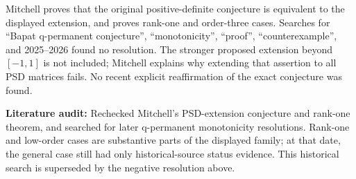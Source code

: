 \documentclass[11pt,a4paper]{article}
\begin{document}
Mitchell proves that the original positive-definite conjecture is
equivalent to the displayed extension, and proves rank-one and
order-three cases. Searches for ``Bapat q-permanent conjecture'',
``monotonicity'', ``proof'', ``counterexample'', and 2025--2026 found no
resolution. The stronger proposed extension beyond \([-1,1]\) is not
included; Mitchell explains why extending that assertion to all PSD
matrices fails. No recent explicit reaffirmation of the exact conjecture
was found.

\textbf{Literature audit:} Rechecked Mitchell's PSD-extension conjecture
and rank-one theorem, and searched for later q-permanent monotonicity
resolutions. Rank-one and low-order cases are substantive parts of the
displayed family; at that date, the general case still had only
historical-source status evidence. This historical search is superseded
by the negative resolution above.
\end{document}
